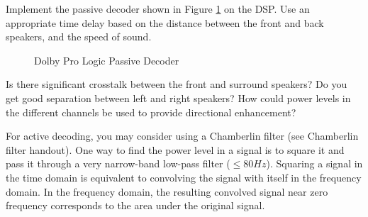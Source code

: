 
%
%
%
%
%

Implement the passive decoder shown in Figure \ref{fig:decoder} on
the DSP.  Use an appropriate time delay based on the distance
between the front and back speakers, and the speed of sound.

\begin{figure}[htb]
    \begin{center}
	\vspace*{0.5cm}
	\caption{Dolby Pro Logic Passive Decoder}
	\label{fig:decoder}
    \end{center}
\end{figure}

Is there significant crosstalk between the front and surround
speakers?  Do you get good separation between left and right
speakers?  How could power levels in the different channels be
used to provide directional enhancement?

For active decoding, you may consider using a Chamberlin filter
(see Chamberlin filter handout).  One way to find the power level
in a signal is to square it and pass it through a very narrow-band low-pass
filter ($\le 80 Hz$).
Squaring a signal in the time domain is equivalent to convolving
the signal with itself in the frequency domain.  In the frequency
domain, the resulting convolved signal near zero frequency corresponds
to the area under the original signal.

